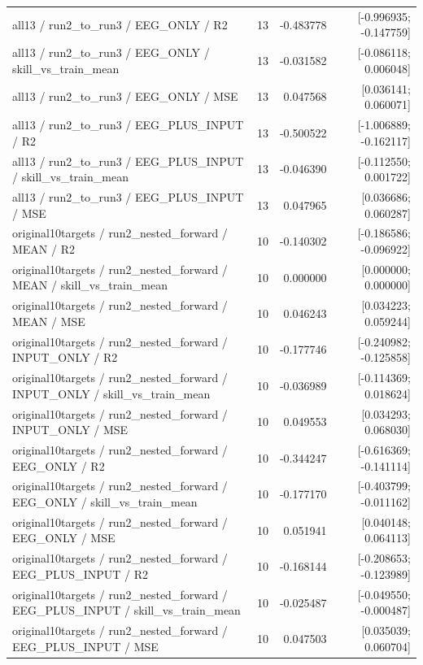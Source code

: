 \begin{longtable}{p{.56\linewidth}rrr}
all13 / run2\_to\_run3 / EEG\_ONLY / R2 & 13 & -0.483778 & [-0.996935; -0.147759] \\
all13 / run2\_to\_run3 / EEG\_ONLY / skill\_vs\_train\_mean & 13 & -0.031582 & [-0.086118; 0.006048] \\
all13 / run2\_to\_run3 / EEG\_ONLY / MSE & 13 & 0.047568 & [0.036141; 0.060071] \\
all13 / run2\_to\_run3 / EEG\_PLUS\_INPUT / R2 & 13 & -0.500522 & [-1.006889; -0.162117] \\
all13 / run2\_to\_run3 / EEG\_PLUS\_INPUT / skill\_vs\_train\_mean & 13 & -0.046390 & [-0.112550; 0.001722] \\
all13 / run2\_to\_run3 / EEG\_PLUS\_INPUT / MSE & 13 & 0.047965 & [0.036686; 0.060287] \\
original10targets / run2\_nested\_forward / MEAN / R2 & 10 & -0.140302 & [-0.186586; -0.096922] \\
original10targets / run2\_nested\_forward / MEAN / skill\_vs\_train\_mean & 10 & 0.000000 & [0.000000; 0.000000] \\
original10targets / run2\_nested\_forward / MEAN / MSE & 10 & 0.046243 & [0.034223; 0.059244] \\
original10targets / run2\_nested\_forward / INPUT\_ONLY / R2 & 10 & -0.177746 & [-0.240982; -0.125858] \\
original10targets / run2\_nested\_forward / INPUT\_ONLY / skill\_vs\_train\_mean & 10 & -0.036989 & [-0.114369; 0.018624] \\
original10targets / run2\_nested\_forward / INPUT\_ONLY / MSE & 10 & 0.049553 & [0.034293; 0.068030] \\
original10targets / run2\_nested\_forward / EEG\_ONLY / R2 & 10 & -0.344247 & [-0.616369; -0.141114] \\
original10targets / run2\_nested\_forward / EEG\_ONLY / skill\_vs\_train\_mean & 10 & -0.177170 & [-0.403799; -0.011162] \\
original10targets / run2\_nested\_forward / EEG\_ONLY / MSE & 10 & 0.051941 & [0.040148; 0.064113] \\
original10targets / run2\_nested\_forward / EEG\_PLUS\_INPUT / R2 & 10 & -0.168144 & [-0.208653; -0.123989] \\
original10targets / run2\_nested\_forward / EEG\_PLUS\_INPUT / skill\_vs\_train\_mean & 10 & -0.025487 & [-0.049550; -0.000487] \\
original10targets / run2\_nested\_forward / EEG\_PLUS\_INPUT / MSE & 10 & 0.047503 & [0.035039; 0.060704] \\

\end{longtable}
